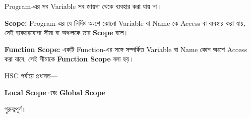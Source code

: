 
Program-এর সব Variable সব জায়গা থেকে ব্যবহার করা যায় না।

\begin{definitionbox}

\textbf{Scope:}
Program-এর যে নির্দিষ্ট অংশে কোনো Variable বা Name-কে
Access বা ব্যবহার করা যায়, সেই ব্যবহারযোগ্য সীমা বা অঞ্চলকে
তার \textbf{Scope} বলে।

\medskip

\textbf{Function Scope:}
একটি Function-এর সঙ্গে সম্পর্কিত Variable বা Name
কোন অংশে Access করা যাবে, সেই সীমাকে
\textbf{Function Scope} বলা হয়।

\end{definitionbox}

HSC পর্যায়ে প্রধানত—

\begin{center}

\textbf{Local Scope}
\qquad এবং \qquad
\textbf{Global Scope}

\end{center}

গুরুত্বপূর্ণ।


